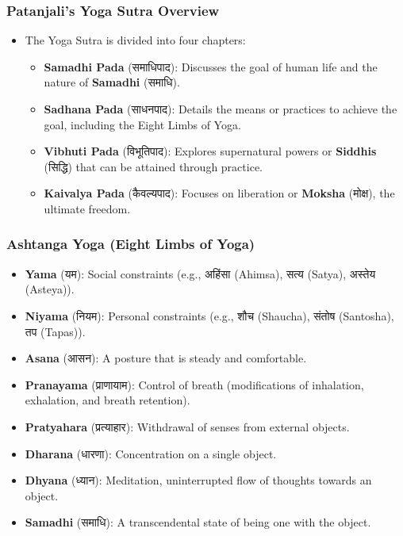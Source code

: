 \begin{frame}[fragile]\frametitle{Patanjali's Yoga Sutra Overview}
    \begin{itemize}
        \item The Yoga Sutra is divided into four chapters:
        \begin{itemize}
            \item \textbf{Samadhi Pada} (समाधिपाद): Discusses the goal of human life and the nature of \textbf{Samadhi} (समाधि).
            \item \textbf{Sadhana Pada} (साधनपाद): Details the means or practices to achieve the goal, including the Eight Limbs of Yoga.
            \item \textbf{Vibhuti Pada} (विभूतिपाद): Explores supernatural powers or \textbf{Siddhis} (सिद्धि) that can be attained through practice.
            \item \textbf{Kaivalya Pada} (कैवल्यपाद): Focuses on liberation or \textbf{Moksha} (मोक्ष), the ultimate freedom.
        \end{itemize}
    \end{itemize}
\end{frame}

\begin{frame}[fragile]\frametitle{Ashtanga Yoga (Eight Limbs of Yoga)}
    \begin{itemize}
        \item \textbf{Yama} (यम): Social constraints (e.g., अहिंसा (Ahimsa), सत्य (Satya), अस्तेय (Asteya)).
        \item \textbf{Niyama} (नियम): Personal constraints (e.g., शौच (Shaucha), संतोष (Santosha), तप (Tapas)).
        \item \textbf{Asana} (आसन): A posture that is steady and comfortable.
        \item \textbf{Pranayama} (प्राणायाम): Control of breath (modifications of inhalation, exhalation, and breath retention).
        \item \textbf{Pratyahara} (प्रत्याहार): Withdrawal of senses from external objects.
        \item \textbf{Dharana} (धारणा): Concentration on a single object.
        \item \textbf{Dhyana} (ध्यान): Meditation, uninterrupted flow of thoughts towards an object.
        \item \textbf{Samadhi} (समाधि): A transcendental state of being one with the object.
    \end{itemize}
\end{frame}

